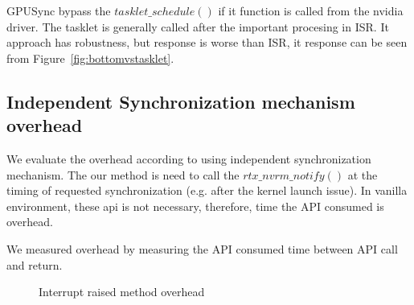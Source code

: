 GPUSync bypass the $tasklet\_schedule()$ if it function is called from the nvidia driver.
The tasklet is generally called after the important procesing in ISR.
It approach has robustness, but response is worse than ISR, it response can be seen from Figure~\ref{fig:bottomvstasklet}.


\subsection{Independent Synchronization mechanism overhead}
We evaluate the overhead according to using independent synchronization mechanism.
The our method is need to call the $rtx\_nvrm\_notify()$ at the timing of requested synchronization (e.g. after the kernel launch issue). 
In vanilla environment, these api is not necessary, therefore, time the API consumed is overhead.

We measured overhead by measuring the API consumed time between API call and return.

\begin{figure}[!t]
\begin{center}
\caption{Interrupt raised method overhead}
\label{fig:irq_rise_overhead}
\end{center}
\end{figure}

